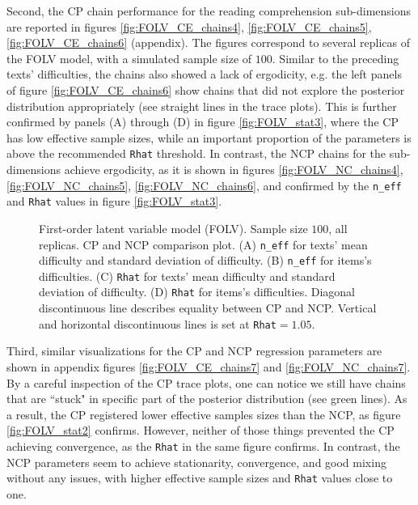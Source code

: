 Second, the CP chain performance for the reading comprehension sub-dimensions are reported in figures \ref{fig:FOLV_CE_chains4}, \ref{fig:FOLV_CE_chains5}, \ref{fig:FOLV_CE_chains6} (appendix). The figures correspond to several replicas of the FOLV model, with a simulated sample size of $100$. Similar to the preceding texts' difficulties, the chains also showed a lack of ergodicity, e.g. the left panels of figure \ref{fig:FOLV_CE_chains6} show chains that did not explore the posterior distribution appropriately (see straight lines in the trace plots). This is further confirmed by panels (A) through (D) in figure \ref{fig:FOLV_stat3}, where the CP has low effective sample sizes, while an important proportion of the parameters is above the recommended \texttt{Rhat} threshold. In contrast, the NCP chains for the sub-dimensions achieve ergodicity, as it is shown in figures \ref{fig:FOLV_NC_chains4}, \ref{fig:FOLV_NC_chains5}, \ref{fig:FOLV_NC_chains6}, and confirmed by the \texttt{n\_eff} and \texttt{Rhat} values in figure \ref{fig:FOLV_stat3}.
%
\begin{figure}[H]
	\centering
	\begin{subfigure}
		\texttt{[image: FOLV\_100\_neff1]}
	\end{subfigure}
	\begin{subfigure}
		\texttt{[image: FOLV\_100\_Rhat1]}
	\end{subfigure}
	\caption[First-order latent variable model (FOLV). Sample size $100$, all replicas. CP and NCP comparison plot.]%
	{First-order latent variable model (FOLV). Sample size $100$, all replicas. CP and NCP comparison plot. (A) \texttt{n\_eff} for texts' mean difficulty and standard deviation of difficulty. (B) \texttt{n\_eff} for items's difficulties. (C) \texttt{Rhat} for texts' mean difficulty and standard deviation of difficulty. (D) \texttt{Rhat} for items's difficulties. Diagonal discontinuous line describes equality between CP and NCP. Vertical and horizontal discontinuous lines is set at \texttt{Rhat}$=1.05$. }
	\label{fig:FOLV_stat1}
\end{figure}

Third, similar visualizations for the CP and NCP regression parameters are shown in appendix figures \ref{fig:FOLV_CE_chains7} and \ref{fig:FOLV_NC_chains7}. By a careful inspection of the CP trace plots, one can notice we still have chains that are ``stuck" in specific part of the posterior distribution (see green lines). As a result, the CP registered lower effective samples sizes than the NCP, as figure \ref{fig:FOLV_stat2} confirms. However, neither of those things prevented the CP achieving convergence, as the \texttt{Rhat} in the same figure confirms. In contrast, the NCP parameters seem to achieve stationarity, convergence, and good mixing without any issues, with higher effective sample sizes and \texttt{Rhat} values close to one.

